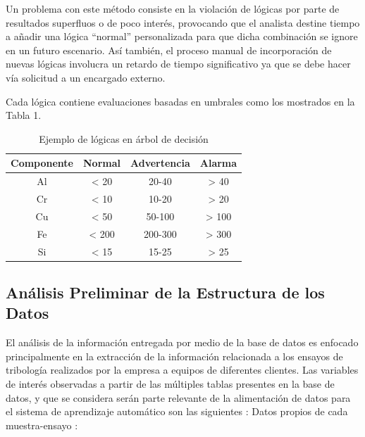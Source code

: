 \documentclass{article}
\begin{document}
Un problema con este método consiste en la violación de lógicas por parte de resultados superfluos o de poco interés, provocando que el analista destine tiempo a añadir una lógica “normal” personalizada para que dicha combinación se ignore en un futuro escenario. Así también, el proceso manual de incorporación de nuevas lógicas involucra un retardo de tiempo significativo ya que se debe hacer vía solicitud a un encargado externo.

Cada lógica contiene evaluaciones basadas en umbrales como los mostrados en la Tabla 1.

\begin{table}[!htbp]\centering
\begin{tabular}{|c|c|c|c|}
\hline 
Componente & Normal & Advertencia & Alarma \\ 
\hline 
Al & < 20 & 20-40 & > 40 \\ 
\hline 
Cr & < 10 & 10-20 & > 20 \\ 
\hline 
Cu & < 50 & 50-100 & > 100 \\ 
\hline 
Fe & < 200 & 200-300 & > 300 \\ 
\hline 
Si & < 15 & 15-25 & > 25 \\ 
\hline 
\end{tabular} \label{tab:limites}
\caption{Ejemplo de l\'ogicas en \'arbol de decisi\'on}
\end{table}


\subsection{Análisis Preliminar de la Estructura de los Datos}

El análisis de la información entregada por medio de la base de datos es enfocado principalmente en la extracción de la información relacionada a los ensayos de tribología realizados por la empresa a equipos de diferentes clientes. Las variables de interés observadas a partir de las múltiples tablas presentes en la base de datos, y que se considera ser\'an parte relevante de la alimentaci\'on de datos para el sistema de aprendizaje automático son las siguientes :
\newline \newline
Datos propios de cada muestra-ensayo :
\end{document}

